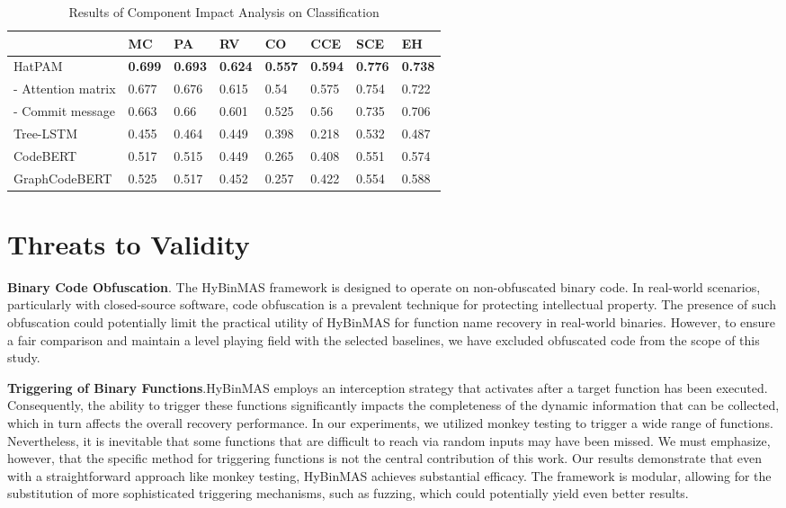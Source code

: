 \documentclass[acmsmall,screen,review,anonymous]{acmart} %
\begin{document}
\renewcommand\arraystretch{1.31}
\begin{table}
  \centering
  \scriptsize
  \caption{Results of Component Impact Analysis on Classification}
    \begin{tabular}{p{2.5cm}p{.8cm}p{.8cm}p{.8cm}p{.8cm} p{.8cm}p{.8cm}p{.8cm}}
    \toprule
    &\textbf{MC} &\textbf{PA} &\textbf{RV} &\textbf{CO} & \textbf{CCE} &\textbf{SCE} &\textbf{EH} \\
    \hline
    HatPAM & \textbf{0.699} & \textbf{0.693} & \textbf{0.624} & \textbf{0.557} & \textbf{0.594} & \textbf{0.776} & \textbf{0.738}\\
    - Attention matrix & 0.677 & 0.676 & 0.615 & 0.54 & 0.575 & 0.754 & 0.722 \\
    - Commit message & 0.663 & 0.66 & 0.601 & 0.525 & 0.56 & 0.735 & 0.706 \\
    \hline
    Tree-LSTM & 0.455 & 0.464 & 0.449 & 0.398 & 0.218 & 0.532 & 0.487\\
     \hline
    CodeBERT & 0.517 & 0.515 & 0.449 & 0.265 & 0.408 & 0.551 & 0.574\\
    \hline
    GraphCodeBERT & 0.525 & 0.517 & 0.452 & 0.257 & 0.422 & 0.554 & 0.588\\
    \hline
    \end{tabular}%
\end{table}%
\renewcommand\arraystretch{1.0}


\section{Threats to Validity}
\textbf{Binary Code Obfuscation}. The HyBinMAS framework is designed to operate on non-obfuscated binary code. In real-world scenarios, particularly with closed-source software, code obfuscation is a prevalent technique for protecting intellectual property. The presence of such obfuscation could potentially limit the practical utility of HyBinMAS for function name recovery in real-world binaries. However, to ensure a fair comparison and maintain a level playing field with the selected baselines, we have excluded obfuscated code from the scope of this study.

\textbf{Triggering of Binary Functions}.HyBinMAS employs an interception strategy that activates after a target function has been executed. Consequently, the ability to trigger these functions significantly impacts the completeness of the dynamic information that can be collected, which in turn affects the overall recovery performance. In our experiments, we utilized monkey testing to trigger a wide range of functions. Nevertheless, it is inevitable that some functions that are difficult to reach via random inputs may have been missed. We must emphasize, however, that the specific method for triggering functions is not the central contribution of this work. Our results demonstrate that even with a straightforward approach like monkey testing, HyBinMAS achieves substantial efficacy. The framework is modular, allowing for the substitution of more sophisticated triggering mechanisms, such as fuzzing, which could potentially yield even better results.
\end{document}

